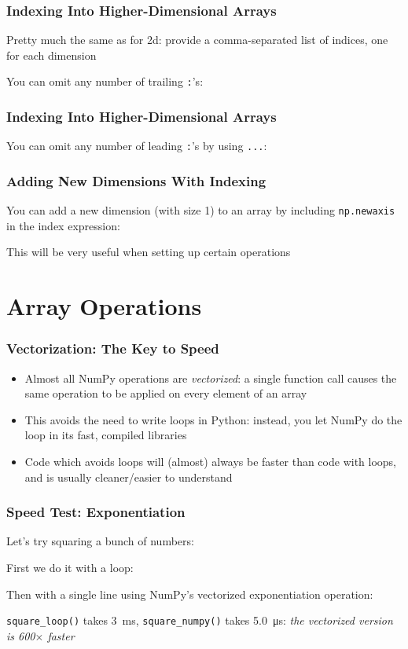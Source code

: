 \documentclass[xcolor={x11names,table}]{beamer}
\begin{document}
\begin{frame}
	\frametitle{Indexing Into Higher-Dimensional Arrays}
	Pretty much the same as for 2d: provide a comma-separated list of indices, one for each dimension
	
	You can omit any number of trailing \texttt{:}'s:
	
\end{frame}

\begin{frame}
	\frametitle{Indexing Into Higher-Dimensional Arrays}
	
	You can omit any number of leading \texttt{:}'s by using \texttt{...}:
	
\end{frame}

\begin{frame}
	\frametitle{Adding New Dimensions With Indexing}
	You can add a new dimension (with size 1) to an array by including \texttt{np.newaxis} in the index expression:
	
	
	This will be very useful when setting up certain operations
\end{frame}

\section{Array Operations}

\begin{frame}
	\frametitle{Vectorization: The Key to Speed}
	\begin{itemize}
		\item Almost all NumPy operations are \emph{vectorized}: a single function call causes the same operation to be applied on every element of an array
		\item This avoids the need to write loops in Python: instead, you let NumPy do the loop in its fast, compiled libraries
		\item Code which avoids loops will (almost) always be faster than code with loops, and is usually cleaner/easier to understand
	\end{itemize}
\end{frame}

\begin{frame}
	\frametitle{Speed Test: Exponentiation}
	Let's try squaring a bunch of numbers:
	
	First we do it with a loop:
	
	Then with a single line using NumPy's vectorized exponentiation operation:
	
	\texttt{square\_loop()} takes \SI{3}{ms}, \texttt{square\_numpy()} takes \SI{5.0}{\micro s}: \emph{the vectorized version is 600$\times$ faster}
\end{frame}
\end{document}
